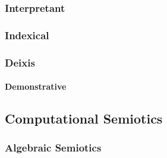 \subsubsection{Interpretant}\label{sec:interpretant}

\subsubsection{Indexical}\label{sec:indexical}

\subsubsection{Deixis}\label{sec:deixis}

\paragraph{Demonstrative}\label{sec:demonstrative}



\subsection{Computational Semiotics}\label{sec:computational_semiotics}

\subsubsection{Algebraic Semiotics}\label{sec:algebraic_semiotics}
